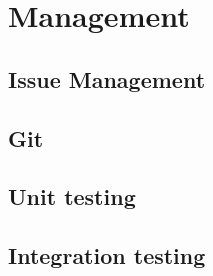\chapter{Management}
\label{chap:management}

\section{Issue Management}
\section{Git}
\section{Unit testing}
\section{Integration testing}

